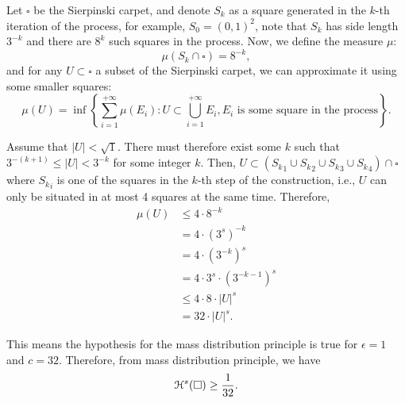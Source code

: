 Let \(\square\) be the Sierpinski carpet, and denote \(S_k\) as a square generated in the \(k\)-th iteration of the process, for example, \(S_0 = (0, 1)^2\), note that \(S_k\) has side length \(3^{-k}\) and there are \(8^{k}\) such squares in the process. Now, we define the measure \(\mu\):
\[
\mu(S_k \cap \square) = 8^{-k},
\]
and for any \(U \subset \square\) a subset of the Sierpinski carpet, we can approximate it using some smaller squares:
\[
\mu(U) = \inf\left\{\sum_{i = 1}^{+\infty} \mu(E_i): U \subset \bigcup_{i = 1}^{+\infty} E_i, E_i \text{ is some square in the process}\right\}.
\]

Assume that \(|U| < \sqrt{1}\). There must therefore exist some \(k\) such that
\(3^{-(k + 1)} \leq |U| < 3^{-k}\) for some integer \(k\). Then, \(U \subset \left({S_k}_1 \cup {S_k}_2 \cup {S_k}_3 \cup {S_k}_4\right) \cap \square\) where \({S_k}_i\) is one of the squares in the \(k\)-th step of the construction, i.e., \(U\) can only be situated in at most 4 squares at the same time. Therefore,
\begin{align*}
    \mu(U) &\leq 4 \cdot 8^{-k}\\
    &= 4 \cdot \left(3^s\right)^{-k}\\
    &= 4 \cdot \left(3^{-k}\right)^s\\
    &= 4 \cdot 3^s \cdot \left(3^{-k - 1}\right)^s\\
    &\leq 4 \cdot 8 \cdot |U|^s\\
    &= 32 \cdot |U|^s.
\end{align*}

This means the hypothesis for the mass distribution principle is true for \(\epsilon = 1\) and \(c = 32\). Therefore, from mass distribution principle, we have
\[
\mathcal{H}^s(\square) \geq \frac{1}{32}.
\]